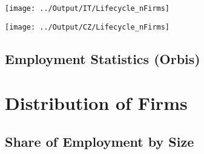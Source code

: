 \documentclass[12pt,notitlepage]{article}
\begin{document}
\begin{figure}[!htpb]
\centering
\caption{Firms Distribution across age}
\begin{subfigure}{.49\textwidth}
    \centering
 \texttt{[image: ../Output/IT/Lifecycle\_nFirms]}
\end{subfigure}%
\begin{subfigure}{.49\textwidth}
    \centering
 \texttt{[image: ../Output/CZ/Lifecycle\_nFirms]}


\subsection{Employment Statistics (Orbis)}
\begin{table}[!htpb]
    \centering
\end{table}
\pagebreak


\FloatBarrier
\section{Distribution of Firms} %
\label{sec:distribution-of-firms}
\FloatBarrier

\subsection{Share of Employment by Size} %
\label{sec:employment_by_size}

\begin{table}[!htpb]
\end{table}



\end{subfigure}
\end{figure}
\end{document}

